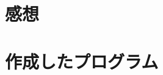\documentclass[a4j,11pt]{jarticle}
\begin{document}
\section{感想}

\section{作成したプログラム}\label{sec:sourcecode}


{\fontsize{10pt}{11pt} \selectfont
\begin{verbatim}
\end{verbatim}
}
\end{document}
